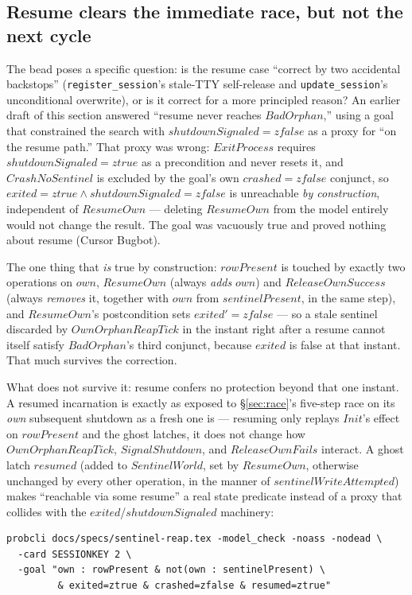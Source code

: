 \documentclass[a4paper,10pt,fleqn]{article}
\begin{document}
\subsection{Resume clears the immediate race, but not the next cycle}
\label{sec:resume-safe}

The bead poses a specific question: is the resume case ``correct by two
accidental backstops'' (\texttt{register\_session}'s stale-TTY
self-release and \texttt{update\_session}'s unconditional overwrite),
or is it correct for a more principled reason?  An earlier draft of
this section answered ``resume never reaches $BadOrphan$,'' using a
goal that constrained the search with $shutdownSignaled = zfalse$ as a
proxy for ``on the resume path.''  That proxy was wrong: $ExitProcess$
requires $shutdownSignaled = ztrue$ as a precondition and never resets
it, and $CrashNoSentinel$ is excluded by the goal's own $crashed =
zfalse$ conjunct, so $exited = ztrue \land shutdownSignaled = zfalse$
is unreachable \emph{by construction}, independent of $ResumeOwn$ ---
deleting $ResumeOwn$ from the model entirely would not change the
result.  The goal was vacuously true and proved nothing about resume
(Cursor Bugbot).

The one thing that \emph{is} true by construction: $rowPresent$ is
touched by exactly two operations on $own$, $ResumeOwn$ (always
\emph{adds} $own$) and $ReleaseOwnSuccess$ (always \emph{removes} it,
together with $own$ from $sentinelPresent$, in the same step), and
$ResumeOwn$'s postcondition sets $exited' = zfalse$ --- so a stale
sentinel discarded by $OwnOrphanReapTick$ in the instant right after a
resume cannot itself satisfy $BadOrphan$'s third conjunct, because
$exited$ is false at that instant.  That much survives the correction.

What does not survive it: resume confers no protection beyond that one
instant.  A resumed incarnation is exactly as exposed to
\S\ref{sec:race}'s five-step race on its \emph{own} subsequent
shutdown as a fresh one is --- resuming only replays $Init$'s effect on
$rowPresent$ and the ghost latches, it does not change how
$OwnOrphanReapTick$, $SignalShutdown$, and $ReleaseOwnFails$ interact.
A ghost latch $resumed$ (added to $SentinelWorld$, set by $ResumeOwn$,
otherwise unchanged by every other operation, in the manner of
$sentinelWriteAttempted$) makes ``reachable via some resume'' a real
state predicate instead of a proxy that collides with the
$exited$/$shutdownSignaled$ machinery:

\begin{verbatim}
probcli docs/specs/sentinel-reap.tex -model_check -noass -nodead \
  -card SESSIONKEY 2 \
  -goal "own : rowPresent & not(own : sentinelPresent) \
         & exited=ztrue & crashed=zfalse & resumed=ztrue"
\end{verbatim}
\end{document}
